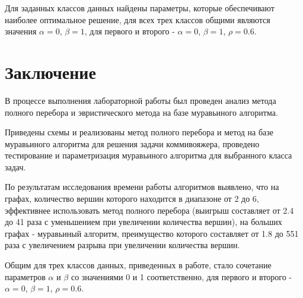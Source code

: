 \documentclass[a4paper,oneside,14pt]{extreport}
\begin{document}
Для заданных классов данных найдены параметры, которые обеспечивают наиболее оптимальное решение, для всех трех классов общими являются значения $\alpha = 0$, $\beta = 1$, для первого и второго - $\alpha = 0$, $\beta = 1$, $\rho = 0.6$.
\newpage

\chapter*{Заключение}
В процессе выполнения лабораторной работы был проведен анализ метода полного перебора и эвристического метода на базе муравьиного алгоритма.

Приведены схемы и реализованы метод полного перебора и метод на базе муравьиного алгоритма для решения задачи коммивояжера, проведено тестирование и параметризация муравьиного алгоритма для выбранного класса задач.

По результатам исследования времени работы алгоритмов выявлено, что на графах, количество вершин которого находится в диапазоне от 2 до 6, эффективнее использовать метод полного перебора (выигрыш составляет от 2.4 до 41 раза с уменьшением при увеличении количества вершин), на больших графах - муравьиный алгоритм, преимущество которого составляет от 1.8 до 551 раза с увеличением разрыва при увеличении количества вершин.

Общим для трех классов данных, приведенных в работе, стало сочетание параметров $\alpha$ и $\beta$ со значениями 0 и 1 соответственно, для первого и второго - $\alpha = 0$, $\beta = 1$, $\rho = 0.6$.
\newpage
{}



\nocite{*}
\end{document}
